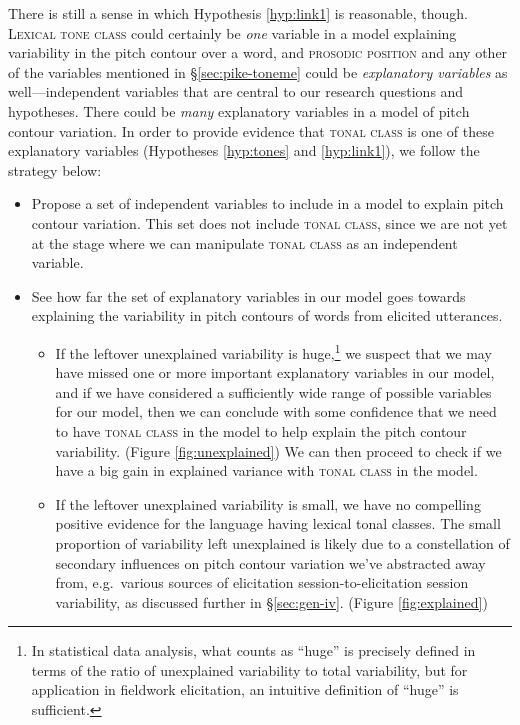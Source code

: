 \documentclass[12pt]{article}
\begin{document}
There is still a sense in which Hypothesis \ref{hyp:link1} is
reasonable, though. \textsc{Lexical tone class} could certainly be \textit{one}
variable in a model explaining variability in the pitch contour over a
word, and \textsc{prosodic position} and any other of the
variables mentioned in \S\ref{sec:pike-toneme} could be \textit{explanatory
variables} as well---independent variables that are
central to our research questions and hypotheses. There could be \textit{many} explanatory variables in a
model of pitch contour variation. In order to provide
evidence that \textsc{tonal class} is one of these explanatory
variables (Hypotheses \ref{hyp:tones} and \ref{hyp:link1}), we follow
the strategy below:  

\begin{itemize}
\item Propose a set of independent variables to include in a model to explain pitch
contour variation. This set does not include \textsc{tonal class},
since we are not yet at the stage where we can manipulate
\textsc{tonal class} as an independent variable. 
 
\item See how far the set of explanatory variables in our model
goes towards explaining the variability in pitch contours of words
from elicited utterances.
\begin{itemize}
  \item If the leftover unexplained
variability is huge,\footnote{In statistical data analysis, what
  counts as ``huge'' is precisely defined in terms of the ratio of
  unexplained variability to total variability, but for application in fieldwork
elicitation, an intuitive definition of ``huge'' is sufficient.} we suspect that we may have missed one or more important
explanatory variables in our model, and if we have considered a
sufficiently wide range of possible variables for our model, then we can
conclude with some confidence that we need to have \textsc{tonal class} in the model
to help explain the pitch contour variability. (Figure
\ref{fig:unexplained}) We can then proceed to check if we have a big
gain in explained variance with \textsc{tonal class} in the model. 
\item If the leftover unexplained variability is small, we have no
compelling positive
evidence for the language having lexical tonal classes. The small
proportion of variability left unexplained is likely due to a
constellation of secondary influences on pitch contour variation we've
abstracted away from, e.g.\ various sources of elicitation
session-to-elicitation session variability, as discussed further in \S\ref{sec:gen-iv}. (Figure \ref{fig:explained})
\end{itemize}
\end{itemize}
\end{document}
